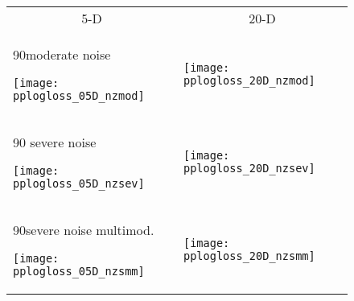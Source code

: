 \documentclass[sigconf]{acmart}
\newcommand{\rot}[2][2.5]{
  \hspace*{-3.5\baselineskip}%
  \begin{rotate}{90}\hspace{#1em}#2
  \end{rotate}}
\begin{document}
{%


\begin{figure}
\begin{tabular}{@{}l@{}@{}l@{}}
\multicolumn{1}{c}{5-D} & \multicolumn{1}{c}{20-D}\\
\rot{moderate noise}
\hspace*{-1mm}
\texttt{[image: pplogloss\_05D\_nzmod]} &
\texttt{[image: pplogloss\_20D\_nzmod]} \\
\rot{$\,\,$severe noise}
\hspace*{-1mm}
\texttt{[image: pplogloss\_05D\_nzsev]} &
\texttt{[image: pplogloss\_20D\_nzsev]} \\
\rot[0.5]{severe noise multimod.}
\hspace*{-1mm}
\texttt{[image: pplogloss\_05D\_nzsmm]} &
\texttt{[image: pplogloss\_20D\_nzsmm]}
\end{tabular}
\caption{\label{fig:aRTlogloss}%
\bbobloglossfigurecaption{}
}
\end{figure}



}{} %
\end{document}
